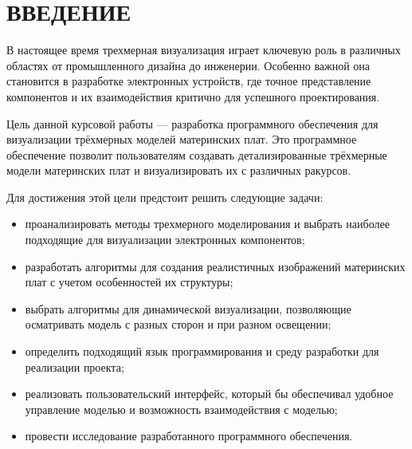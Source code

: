 \chapter*{ВВЕДЕНИЕ}

В настоящее время трехмерная визуализация играет ключевую роль в различных областях от промышленного дизайна до инженерии. Особенно важной она становится в разработке электронных устройств, где точное представление компонентов и их взаимодействия критично для успешного проектирования.

Цель данной курсовой работы --- разработка программного обеспечения для визуализации трёхмерных моделей материнских плат. Это программное обеспечение позволит пользователям создавать детализированные трёхмерные модели материнских плат и визуализировать их с различных ракурсов.


Для достижения этой цели предстоит решить следующие задачи:
\begin{itemize}[label=---]
	\item проанализировать методы трехмерного моделирования и выбрать наиболее подходящие для визуализации электронных компонентов;
	\item разработать алгоритмы для создания реалистичных изображений материнских плат с учетом особенностей их структуры;
	\item выбрать алгоритмы для динамической визуализации, позволяющие осматривать модель с разных сторон и при разном освещении;
	\item определить подходящий язык программирования и среду разработки для реализации проекта;
	\item реализовать пользовательский интерфейс, который бы обеспечивал удобное управление моделью и возможность взаимодействия с моделью;
	\item провести исследование разработанного программного обеспечения.
\end{itemize}

